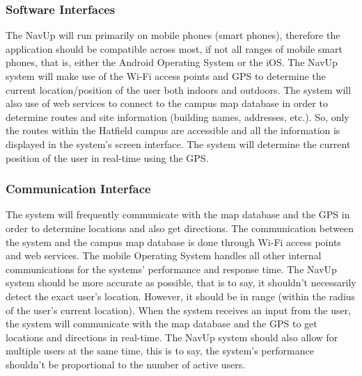 \documentclass[12pt, a4paper]{article}
\begin{document}
	\subsubsection{Software Interfaces}
The NavUp will run primarily on mobile phones (smart phones), therefore the application should be compatible across most, if not all ranges of mobile smart phones, that is, either the Android Operating System or the iOS. The NavUp system will make use of the Wi-Fi access points and GPS to determine the current location/position of the user both indoors and outdoors. The system will also use of web services to connect to the campus map database in order to determine routes and site information (building names, addresses, etc.). So, only the routes within the Hatfield campus are accessible and all the information is displayed in the system’s screen interface. The system will determine the current position of the user in real-time using the GPS. \\

	\subsubsection{Communication Interface}
The system will frequently communicate with the map database and the GPS in order to determine locations and also get directions. The communication between the system and the campus map database is done through Wi-Fi access points and web services. The mobile Operating System handles all other internal communications for the systems’ performance and response time. 
The NavUp system should be more accurate as possible, that is to say, it shouldn’t necessarily detect the exact user’s location. However, it should be in range (within the radius of the user’s current location). When the system receives an input from the user, the system will communicate with the map database and the GPS to get locations and directions in real-time. The NavUp system should also allow for multiple users at the same time, this is to say, the system’s performance shouldn’t be proportional to the number of active users. \\
\end{document}
